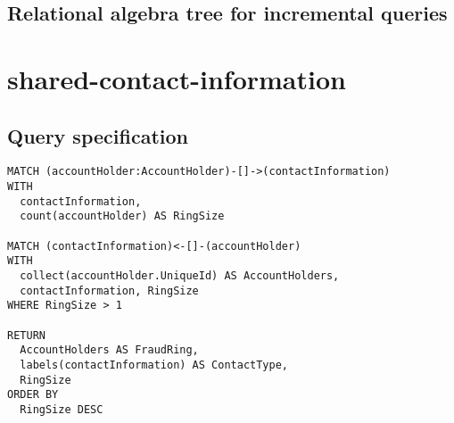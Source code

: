 \subsection*{Relational algebra tree for incremental queries}

\section{shared-contact-information}

\subsection*{Query specification}

\begin{lstlisting}
MATCH (accountHolder:AccountHolder)-[]->(contactInformation)
WITH
  contactInformation,
  count(accountHolder) AS RingSize

MATCH (contactInformation)<-[]-(accountHolder)
WITH
  collect(accountHolder.UniqueId) AS AccountHolders,
  contactInformation, RingSize
WHERE RingSize > 1

RETURN
  AccountHolders AS FraudRing,
  labels(contactInformation) AS ContactType,
  RingSize
ORDER BY
  RingSize DESC
\end{lstlisting}

